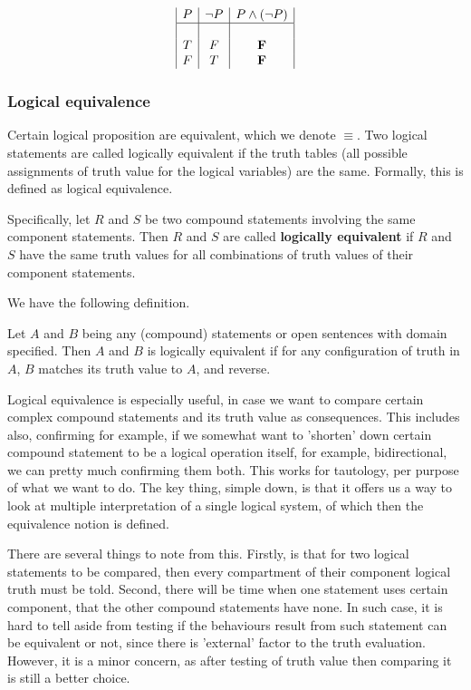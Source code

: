 \begin{equation*}
    \begin{array}{|c|c|c|}
        P  & \lnot P & P \land (\lnot P) \\
        \hline & & \\
        T & F & \mathbf{F} \\
        F & T & \mathbf{F}
    \end{array}
\end{equation*}

\subsubsection{Logical equivalence}

Certain logical proposition are equivalent, which we denote $\equiv$. Two logical statements are called logically equivalent if the truth tables (all possible assignments of truth value for the logical variables) are the same. Formally, this is defined as  logical equivalence.

Specifically, let $R$ and $S$ be two compound statements involving the same component statements. Then $R$ and $S$ are called \textbf{logically equivalent} if $R$ and $S$ have the same truth values for all combinations of truth values of their component statements.

We have the following definition. 

\begin{definition}
    Let $A$ and $B$ being any (compound) statements or open sentences with domain specified. Then $A$ and $B$ is logically equivalent if for any configuration of truth in $A$, $B$ matches its truth value to $A$, and reverse. 
\end{definition}

Logical equivalence is especially useful, in case we want to compare certain complex compound statements and its truth value as consequences. This includes also, confirming for example, if we somewhat want to 'shorten' down certain compound statement to be a logical operation itself, for example, bidirectional, we can pretty much confirming them both. This works for tautology, per purpose of what we want to do. The key thing, simple down, is that it offers us a way to look at multiple interpretation of a single logical system, of which then the equivalence notion is defined. 

There are several things to note from this. Firstly, is that for two logical statements to be compared, then every compartment of their component logical truth must be told. Second, there will be time when one statement uses certain component, that the other compound statements have none. In such case, it is hard to tell aside from testing if the behaviours result from such statement can be equivalent or not, since there is 'external' factor to the truth evaluation. However, it is a minor concern, as after testing of truth value then comparing it is still a better choice. 

